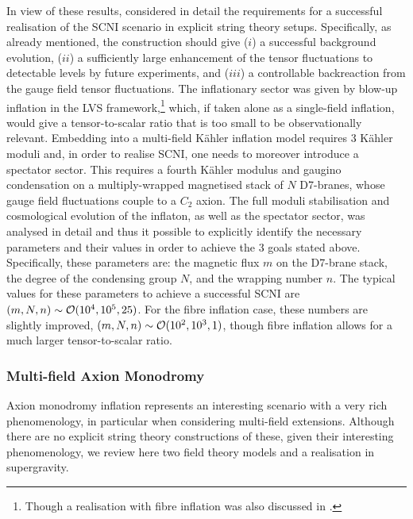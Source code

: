In view  of these results, \cite{Holland:2020jdh} considered in detail the requirements for a successful realisation of the SCNI scenario in explicit  string theory setups. Specifically, as already  mentioned, the construction should give ($i$) a successful background evolution, ($ii$) a sufficiently large enhancement of the tensor fluctuations to  detectable levels by future experiments, and ($iii$) a controllable backreaction from the gauge field tensor fluctuations.  The inflationary sector was given by blow-up inflation in the LVS framework,\footnote{Though a realisation with fibre inflation was also discussed in \cite{Holland:2020jdh}.} which, if taken alone as a single-field inflation, would give a tensor-to-scalar ratio that is too small to be observationally relevant.  Embedding into a multi-field K\"ahler inflation model requires 3 K\"ahler moduli and, in order to realise  SCNI, one needs to moreover introduce a spectator sector. This requires a fourth K\"ahler modulus and gaugino condensation on a multiply-wrapped magnetised stack of $N$ D7-branes, whose gauge field fluctuations couple to a $C_2$ axion. The full moduli stabilisation and cosmological evolution
of the inflaton, as well as the spectator sector, was analysed in detail and thus it possible to  explicitly identify the necessary parameters and their values in order to achieve the 3 goals stated above. Specifically, these parameters are: the magnetic flux $m$ on the D7-brane stack, the degree of the condensing group $N$, and the wrapping number $n$. The typical values for these parameters to achieve a successful SCNI are $(m,N,n) \sim {\cal O} (10^4,10^5,25)$. For the fibre inflation case, these numbers are slightly improved, $(m,N,n) \sim {\cal O} (10^2,10^3,1)$, though fibre inflation allows for a much larger tensor-to-scalar ratio. 



\subsubsection*{Multi-field Axion Monodromy}

Axion monodromy inflation represents an interesting scenario with a very rich phenomenology, in particular when considering multi-field extensions. Although there are no explicit string theory constructions of these, given their interesting phenomenology, we review here two  field theory models and a realisation in supergravity. 

